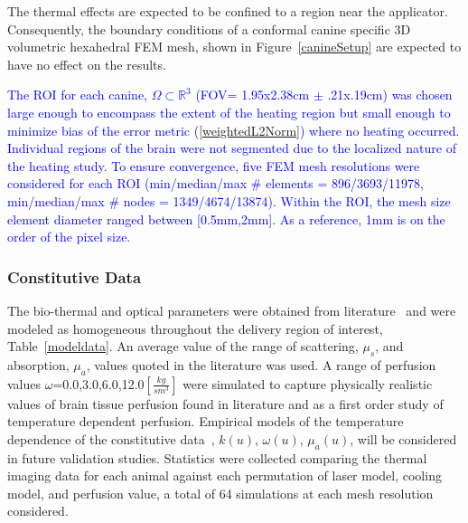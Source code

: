 \documentclass{article}
\newcommand{\eqn}[1]{(\ref{#1})}
\begin{document}

The thermal effects are expected to be confined to a region near
the applicator. Consequently, the boundary conditions of a
conformal canine specific 3D volumetric hexahedral FEM mesh, shown
in Figure~\ref{canineSetup} are expected to have no effect on the
results.  



\textcolor{blue}{ %
The ROI for each canine, $\Omega \subset \mathbb{R}^3$ (FOV=
1.95x2.38cm $\pm$ .21x.19cm) 
was chosen large enough to encompass the
extent of the heating region but small enough to minimize bias of
the error metric \eqn{weightedL2Norm} where no  heating occurred.
Individual regions of the brain were not segmented due to the
localized nature of the heating study.
To ensure convergence, five FEM mesh resolutions were considered for
each ROI (min/median/max \# elements = 896/3693/11978, 
          min/median/max \# nodes    = 1349/4674/13874).
Within the ROI, the mesh size element diameter ranged between
[0.5mm,2mm]. As a reference, 1mm is on the order of the pixel size.
}


\subsubsection{Constitutive Data}

The bio-thermal and optical parameters were obtained from
literature~\cite{Handbook05,Welch95,duck1990} and were modeled as
homogeneous throughout the delivery region of interest,
Table~\ref{modeldata}.  An average value of the range of
scattering, $\mu_s$, and absorption, $\mu_a$, values quoted in the
literature was used.  A range of perfusion values
$\omega$=0.0,3.0,6.0,12.0$[\frac{kg}{s m^3}]$ were simulated to
capture physically realistic values of brain tissue perfusion found
in literature and as a first order study of temperature dependent
perfusion.  Empirical models of the temperature dependence of the
constitutive data~\cite{pegau1997absorption,Duggan00,Handbook05},
$k(u)$, $\omega(u)$, $\mu_a(u)$, will be considered in future
validation studies.  Statistics were collected comparing the
thermal imaging data for each animal against each permutation of
laser model, cooling model, and perfusion value, a total of 64
simulations at each mesh resolution considered. 
\end{document}
